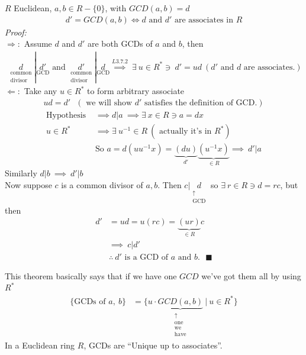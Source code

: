 \begin{theorem*}
    $R$ Euclidean, $a,b \in R-\{0\}$, with $GCD(a,b)=d$
    \begin{align*}
        d' =GCD(a,b) \iff d \text{ and }d' \text{ are associates in }R
    \end{align*}
    \textit{Proof:} \\ \steezybreak
    $\Rightarrow:$ Assume $d$ and $d'$ are both GCDs of $a$ and $b$, then 
    \begin{align*}
        \underset{\substack{\text{common}\\ \text{divisor}}}{d}|\underset{\text{GCD}}{d'} \text{  and  } \underset{\substack{\text{common}\\ \text{divisor}}}{d'}|\underset{\text{GCD}}{d} \overset{L3.7.2}{\implies} \ \exists \ u \in R^* \ni \ d'=ud \ (d'\text{ and }d\text{ are associates.})
    \end{align*}
    $\Leftarrow:$ Take any $u\in R^*$ to form arbitrary associate 
    \begin{align*}
        ud=d' \ \ \ (\text{ we will show }d' \text{ satisfies the definition of GCD.})
    \end{align*}
    \begin{align*}
        \text{Hypothesis }&\implies d|a \ \implies \exists \ x\in R \ni a= dx \\
        u \in R^* &\implies \exists \ u^{-1}\in R \ (\text{ actually it's in }R^*)\\
        &\text{So } a=d(uu^{-1}x) = \underbrace{(du)}_{d'}\underbrace{(u^{-1}x)}_{\in R} \implies \ d'|a
    \end{align*}
    Similarly $d|b \ \implies \ d'|b$\\
    Now suppose $c$ is a common divisor of $a,b$. Then $c|\underset{\substack{\uparrow \\ \text{GCD}}}{d}$ so $\exists \ r\in R \ni d=rc$, but then 
    \begin{align*}
        d'&=ud=u(rc) = \underbrace{(ur)}_{\in R}c \\
        &\implies \ c|d' \\
        &\therefore \ d' \text{ is a GCD of }a \text{ and }b. \ \ \ \blacksquare
    \end{align*}
\end{theorem*}
This theorem basically says that if we have one $GCD$ we've got them all by using $R^*$
\begin{align*}
    \{\text{GCDs of }a,\ b\} &= \{u\cdot \underbrace{GCD(a,b)}_{\substack{\uparrow \\ \text{one}\\ \text{we} \\ \text{have}}} \ | \ u \in R^*\}
\end{align*}
In a Euclidean ring $R$, GCDs are ``Unique up to associates''. 


